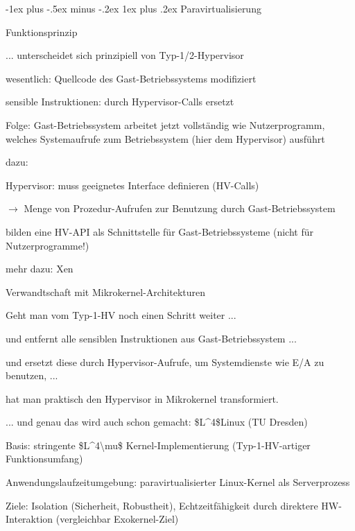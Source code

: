 \documentclass[a4paper]{article}
\makeatletter
\renewcommand{\subsubsection}{\@startsection{subsubsection}{3}{0mm}%
 {-1ex plus -.5ex minus -.2ex}%
 {1ex plus .2ex}%
 {\normalfont\small\bfseries}}
\makeatother
\begin{document}
\begin{multicols}{3}
    \subsubsection{Paravirtualisierung}

    Funktionsprinzip

    \begin{itemize*}
        \item
        ... unterscheidet sich prinzipiell von Typ-1/2-Hypervisor
        \item
        wesentlich: Quellcode des Gast-Betriebssystems modifiziert
        \item
        sensible Instruktionen: durch Hypervisor-Calls ersetzt
        \item
        Folge: Gast-Betriebssystem arbeitet jetzt vollständig wie
        Nutzerprogramm, welches Systemaufrufe zum Betriebssystem (hier dem
        Hypervisor) ausführt
        \item
        dazu:
        \begin{itemize*}
            \item Hypervisor: muss geeignetes Interface definieren (HV-Calls)
            \item $\rightarrow$ Menge von Prozedur-Aufrufen zur Benutzung durch Gast-Betriebssystem
            \item bilden eine HV-API als Schnittstelle für Gast-Betriebssysteme (nicht für Nutzerprogramme!)
        \end{itemize*}
        \item
        mehr dazu: Xen
    \end{itemize*}

    Verwandtschaft mit Mikrokernel-Architekturen

    \begin{itemize*}
        \item
        Geht man vom Typ-1-HV noch einen Schritt weiter ...
        \begin{itemize*}
            \item und entfernt alle sensiblen Instruktionen aus Gast-Betriebssystem ...
            \item und ersetzt diese durch Hypervisor-Aufrufe, um Systemdienste wie E/A zu benutzen, ...
            \item hat man praktisch den Hypervisor in Mikrokernel transformiert.
        \end{itemize*}
        \item
        ... und genau das wird auch schon gemacht: \$L\^{}4\$Linux (TU
        Dresden)
        \begin{itemize*}
            \item Basis: stringente \$L\^{}4\textbackslash mu\$ Kernel-Implementierung (Typ-1-HV-artiger Funktionsumfang)
            \item Anwendungslaufzeitumgebung: paravirtualisierter Linux-Kernel als Serverprozess
            \item Ziele: Isolation (Sicherheit, Robustheit), Echtzeitfähigkeit durch direktere HW-Interaktion (vergleichbar Exokernel-Ziel)
        \end{itemize*}
    \end{itemize*}


\end{multicols}
\end{document}
